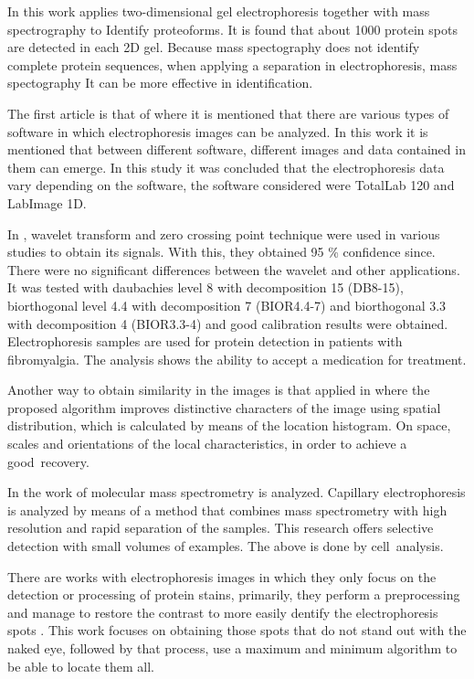 \documentclass[a4paper]{llncs}
\begin{document}
 
In this work \cite{Zhan} applies two-dimensional gel electrophoresis together with mass spectrography to
Identify proteoforms. It is found that about 1000 protein spots are detected in each 2D gel. Because mass spectography does not identify complete protein sequences, when applying a separation in electrophoresis, mass spectography
It can be more effective in identification.

The first article is that of \cite{Kalenberg} where it is mentioned that there are various types of software in which electrophoresis images can be analyzed. In this work it is mentioned that between different software, different images and data contained in them can emerge. In this study it was concluded that the electrophoresis data vary depending on the software, the software considered were TotalLab 120 and LabImage 1D.



In \cite{Reza-Sohrabi}, wavelet transform and zero crossing point technique were used in various studies to obtain its signals. With this, they obtained 95 \% confidence since. There were no significant differences between the wavelet and other applications. It was tested with daubachies level 8 with decomposition 15 (DB8-15), biorthogonal level 4.4 with decomposition 7 (BIOR4.4-7) and biorthogonal 3.3 with decomposition 4 (BIOR3.3-4) and good calibration results were obtained. Electrophoresis samples are used for protein detection in patients with fibromyalgia. The analysis shows the ability to accept a medication for treatment.


Another way to obtain similarity in the images is that applied in \cite{Liu} where the proposed algorithm improves distinctive characters of the image using spatial distribution, which is calculated by means of the location histogram. On space, scales and orientations of the local characteristics, in order to achieve a good~recovery.

In the work of \cite{Zhou} molecular mass spectrometry is analyzed. Capillary electrophoresis is analyzed by means of a method that combines mass spectrometry with high resolution and rapid separation of the samples. This research offers selective detection with small volumes of examples. The above is done by cell~analysis.



There are works with electrophoresis images in which they only focus on the detection or processing of protein stains, primarily, they perform a preprocessing and manage to restore the contrast to more easily dentify the electrophoresis spots \cite{Salazar-Centeno}. This work focuses on obtaining those spots that do not stand out with the naked eye, followed by that process, use a maximum and minimum algorithm to be able to locate them all.
\end{document}
